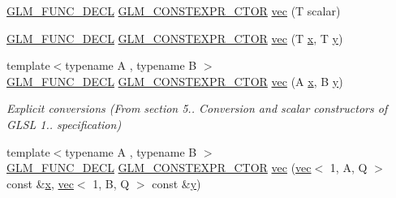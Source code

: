 \begin{DoxyCompactItemize}
\item 
\mbox{\hyperlink{setup_8hpp_ab2d052de21a70539923e9bcbf6e83a51}{G\+L\+M\+\_\+\+F\+U\+N\+C\+\_\+\+D\+E\+CL}} \mbox{\hyperlink{setup_8hpp_ad34178a09666081abdb573c14d1f4a5a}{G\+L\+M\+\_\+\+C\+O\+N\+S\+T\+E\+X\+P\+R\+\_\+\+C\+T\+OR}} \mbox{\hyperlink{structglm_1_1vec_3_012_00_01_t_00_01_q_01_4_a638fde20902e4e7546f71dfad919a17f}{vec}} (T scalar)
\item 
\mbox{\hyperlink{setup_8hpp_ab2d052de21a70539923e9bcbf6e83a51}{G\+L\+M\+\_\+\+F\+U\+N\+C\+\_\+\+D\+E\+CL}} \mbox{\hyperlink{setup_8hpp_ad34178a09666081abdb573c14d1f4a5a}{G\+L\+M\+\_\+\+C\+O\+N\+S\+T\+E\+X\+P\+R\+\_\+\+C\+T\+OR}} \mbox{\hyperlink{structglm_1_1vec_3_012_00_01_t_00_01_q_01_4_a283bdd9caea39778ed8ff4717b904718}{vec}} (T \mbox{\hyperlink{_s_d_l__opengl_8h_ad0e63d0edcdbd3d79554076bf309fd47}{x}}, T \mbox{\hyperlink{_s_d_l__opengl_8h_a1675d9d7bb68e1657ff028643b4037e3}{y}})
\item 
{\footnotesize template$<$typename A , typename B $>$ }\\\mbox{\hyperlink{setup_8hpp_ab2d052de21a70539923e9bcbf6e83a51}{G\+L\+M\+\_\+\+F\+U\+N\+C\+\_\+\+D\+E\+CL}} \mbox{\hyperlink{setup_8hpp_ad34178a09666081abdb573c14d1f4a5a}{G\+L\+M\+\_\+\+C\+O\+N\+S\+T\+E\+X\+P\+R\+\_\+\+C\+T\+OR}} \mbox{\hyperlink{structglm_1_1vec_3_012_00_01_t_00_01_q_01_4_abea96c6b6d58c8388feaebb73af0cb68}{vec}} (A \mbox{\hyperlink{_s_d_l__opengl_8h_ad0e63d0edcdbd3d79554076bf309fd47}{x}}, B \mbox{\hyperlink{_s_d_l__opengl_8h_a1675d9d7bb68e1657ff028643b4037e3}{y}})
\begin{DoxyCompactList}\small\item\em Explicit conversions (From section 5.. Conversion and scalar constructors of G\+L\+SL 1.. specification) \end{DoxyCompactList}\item 
{\footnotesize template$<$typename A , typename B $>$ }\\\mbox{\hyperlink{setup_8hpp_ab2d052de21a70539923e9bcbf6e83a51}{G\+L\+M\+\_\+\+F\+U\+N\+C\+\_\+\+D\+E\+CL}} \mbox{\hyperlink{setup_8hpp_ad34178a09666081abdb573c14d1f4a5a}{G\+L\+M\+\_\+\+C\+O\+N\+S\+T\+E\+X\+P\+R\+\_\+\+C\+T\+OR}} \mbox{\hyperlink{structglm_1_1vec_3_012_00_01_t_00_01_q_01_4_a72065648c117a667a7f06353b880a0aa}{vec}} (\mbox{\hyperlink{structglm_1_1vec}{vec}}$<$ 1, A, Q $>$ const \&\mbox{\hyperlink{_s_d_l__opengl_8h_ad0e63d0edcdbd3d79554076bf309fd47}{x}}, \mbox{\hyperlink{structglm_1_1vec}{vec}}$<$ 1, B, Q $>$ const \&\mbox{\hyperlink{_s_d_l__opengl_8h_a1675d9d7bb68e1657ff028643b4037e3}{y}})

\end{DoxyCompactItemize}
